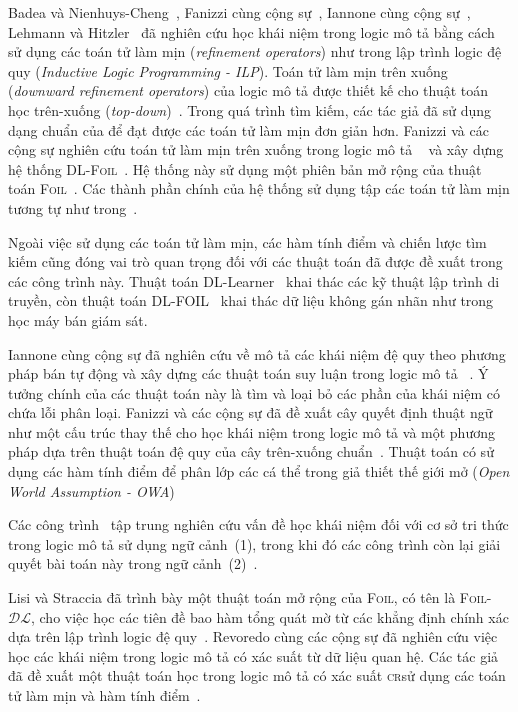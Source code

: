 Badea và Nienhuys-Cheng~\cite{Badea2000}, Fanizzi cùng cộng sự~\cite{Fanizzi2004,Fanizzi2008}, Iannone cùng cộng sự~\cite{Iannone2007}, Lehmann và Hitzler~\cite{Lehmann2007,Lehmann2010} đã nghiên cứu học khái niệm trong logic mô tả bằng cách sử dụng các toán tử làm mịn ({\em refinement operators}) như trong lập trình logic đệ quy ({\em Inductive Logic Programming - ILP}).
%
Toán tử làm mịn trên xuống ({\em downward refinement operators}) của logic mô tả \ALER được thiết kế cho thuật toán học trên-xuống ({\em top-down})~\cite{Badea2000}. Trong quá trình tìm kiếm, các tác giả đã sử dụng dạng chuẩn của \ALER để đạt được các toán tử làm mịn đơn giản hơn.
%
Fanizzi và các cộng sự nghiên cứu toán tử làm mịn trên xuống trong logic mô tả \ALN~\cite{Fanizzi2004} và xây dựng hệ thống \textsc{DL-Foil}~\cite{Fanizzi2008}. Hệ thống này sử dụng một phiên bản mở rộng của thuật toán \textsc{Foil}~\cite{Quinlan1990}. Các thành phần chính của hệ thống sử dụng tập các toán tử làm mịn tương tự như trong~\cite{Badea2000}.
%

Ngoài việc sử dụng các toán tử làm mịn, các hàm tính điểm và chiến lược tìm kiếm cũng đóng vai trò quan trọng đối với các thuật toán đã được đề xuất trong các công trình này. Thuật toán DL-Learner~\cite{Lehmann2010} khai thác các kỹ thuật lập trình di truyền, còn thuật toán DL-FOIL~\cite{Fanizzi2008} khai thác dữ liệu không gán nhãn như trong học máy bán giám sát.
%

Iannone cùng cộng sự đã nghiên cứu về mô tả các khái niệm đệ quy theo phương pháp bán tự động và xây dựng các thuật toán suy luận trong logic mô tả \ALC~\cite{Iannone2007}. Ý tưởng chính của các thuật toán này là tìm và loại bỏ các phần của khái niệm có chứa lỗi phân loại.
%
Fanizzi và các cộng sự đã đề xuất cây quyết định thuật ngữ như một cấu trúc thay thế cho học khái niệm trong logic mô tả và một phương pháp dựa trên thuật toán đệ quy của cây trên-xuống chuẩn~\cite{Fanizzi2010}. Thuật toán có sử dụng các hàm tính điểm để phân lớp các cá thể trong giả thiết thế giới mở ({\em Open World Assumption - OWA})

Các công trình~\cite{Badea2000,Iannone2007} tập trung nghiên cứu vấn đề học khái niệm đối với cơ sở tri thức trong logic mô tả sử dụng ngữ cảnh~(1), trong khi đó các công trình còn lại giải quyết bài toán này trong ngữ cảnh~(2)~\cite{Fanizzi2004,Fanizzi2008,Lehmann2007,Lehmann2010}.

Lisi và Straccia đã trình bày một thuật toán mở rộng của \textsc{Foil}, có tên là \textsc{Foil-}$\mathcal{DL}$, cho việc học các tiên đề bao hàm tổng quát mờ từ các khẳng định chính xác dựa trên lập trình logic đệ quy~\cite{Lisi2013}. Revoredo cùng các cộng sự đã nghiên cứu việc học các khái niệm trong logic mô tả có xác suất từ dữ liệu quan hệ. Các tác giả đã đề xuất một thuật toán học trong logic mô tả có xác suất \textsc{cr}\ALC sử dụng các toán tử làm mịn và hàm tính điểm~\cite{Revoredo2010}.

